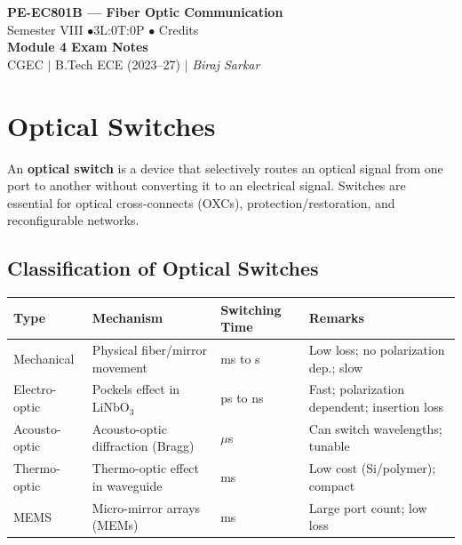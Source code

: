 \documentclass[12pt,a4paper]{article}
\renewcommand{\arraystretch}{1.45}
\begin{document}
\begin{center}
  {\LARGE\bfseries\color{myred} PE-EC801B --- Fiber Optic Communication}\\[5pt]
  {\normalsize\color{mydark} Semester VIII \quad$\bullet$\quad 3L:0T:0P \quad$\bullet$ Credits}\\[3pt]
  {\normalsize\color{myteal}\textbf{Module 4 Exam Notes}}\\[3pt]
  {\small\color{mydark} CGEC \;$|$\; B.Tech ECE (2023--27) \;$|$\; \textit{Biraj Sarkar}}
\end{center}
\vspace{2pt}
\noindent{\color{myred}\rule{\linewidth}{1.5pt}}
\vspace{2pt}

\hypersetup{linkcolor=mydark}
\tableofcontents
\hypersetup{linkcolor=myteal}
\newpage

\section{Optical Switches}

\begin{tcolorbox}[defbox, title={\textbf{Optical Switch}}]
An \textbf{optical switch} is a device that selectively routes an optical signal from one port to another without converting it to an electrical signal. Switches are essential for optical cross-connects (OXCs), protection/restoration, and reconfigurable networks.
\end{tcolorbox}

\subsection{Classification of Optical Switches}
\par\noindent
{\renewcommand{\arraystretch}{1.55}
\begin{tabularx}{\linewidth}{|B{3.0cm}|Y|Y|Y|}
\hline
\textbf{Type} & \textbf{Mechanism} & \textbf{Switching Time} & \textbf{Remarks} \\
\hline
Mechanical & Physical fiber/mirror movement & ms to s & Low loss; no polarization dep.; slow \\
\hline
Electro-optic & Pockels effect in LiNbO$_3$ & ps to ns & Fast; polarization dependent; insertion loss \\
\hline
Acousto-optic & Acousto-optic diffraction (Bragg) & $\mu$s & Can switch wavelengths; tunable \\
\hline
Thermo-optic & Thermo-optic effect in waveguide & ms & Low cost (Si/polymer); compact \\
\hline
MEMS & Micro-mirror arrays (MEMs) & ms & Large port count; low loss \\
\hline
\end{tabularx}}
\end{document}
